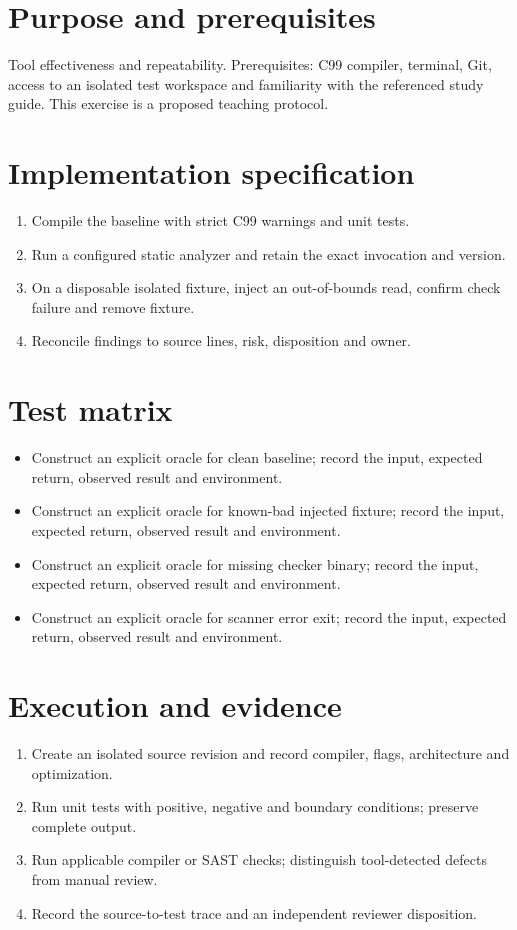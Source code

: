 \documentclass[10pt,letterpaper]{article}
\begin{document}
\makedoctitle
\makedocsummary
\section{Purpose and prerequisites}
Tool effectiveness and repeatability. Prerequisites: C99 compiler, terminal, Git, access to an isolated test workspace and familiarity with the referenced study guide. This exercise is a proposed teaching protocol.
\section{Implementation specification}
\begin{enumerate}
\item Compile the baseline with strict C99 warnings and unit tests.
\item Run a configured static analyzer and retain the exact invocation and version.
\item On a disposable isolated fixture, inject an out-of-bounds read, confirm check failure and remove fixture.
\item Reconcile findings to source lines, risk, disposition and owner.
\end{enumerate}

\section{Test matrix}
\begin{itemize}
\item Construct an explicit oracle for clean baseline; record the input, expected return, observed result and environment.
\item Construct an explicit oracle for known-bad injected fixture; record the input, expected return, observed result and environment.
\item Construct an explicit oracle for missing checker binary; record the input, expected return, observed result and environment.
\item Construct an explicit oracle for scanner error exit; record the input, expected return, observed result and environment.
\end{itemize}

\section{Execution and evidence}
\begin{enumerate}
\item Create an isolated source revision and record compiler, flags, architecture and optimization.
\item Run unit tests with positive, negative and boundary conditions; preserve complete output.
\item Run applicable compiler or SAST checks; distinguish tool-detected defects from manual review.
\item Record the source-to-test trace and an independent reviewer disposition.
\end{enumerate}
\end{document}
